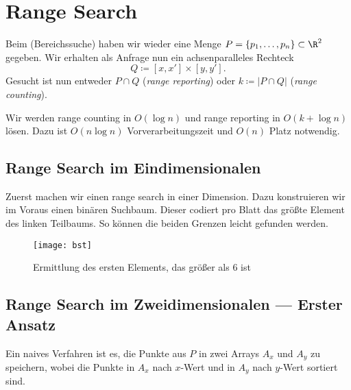\section{Range Search}

Beim  (Bereichssuche) haben wir wieder eine Menge \( P = \left \{ p_1, \dots, p_n \right \} \subset \R^2 \) gegeben. Wir erhalten als Anfrage nun ein achsenparalleles Rechteck
\begin{equation*}
  Q \coloneqq [x,x'] \times [y,y']\text{.}
\end{equation*}
Gesucht ist nun entweder \( P \cap Q \) (\emph{range reporting}) oder \( k \coloneqq \left\vert P \cap Q \right\vert \) (\emph{range counting}).

Wir werden range counting in \( O(\log n) \) und range reporting in \( O(k+\log n) \) lösen. Dazu ist \( O(n\log n) \) Vorverarbeitungszeit und \( O(n) \) Platz notwendig.

\subsection{Range Search im Eindimensionalen}

\begin{minipage}{.55\textwidth}
  Zuerst machen wir einen range search in einer Dimension. Dazu konstruieren wir im Voraus einen binären Suchbaum. Dieser codiert pro Blatt das größte Element des linken Teilbaums. So können die beiden Grenzen leicht gefunden werden.
  \vspace*{1em}
\end{minipage}
\hfill
\begin{minipage}{.3\textwidth}
  \begin{figure}[H]
    \texttt{[image: bst]}
    \caption{Ermittlung des ersten Elements, das größer als \( 6 \) ist}
  \end{figure}
  \vspace*{1em}
\end{minipage}

\subsection{Range Search im Zweidimensionalen --- Erster Ansatz}

Ein naives Verfahren ist es, die Punkte aus \( P \) in zwei Arrays \( A_x \) und \( A_y \) zu speichern, wobei die Punkte in \( A_x \) nach \( x \)-Wert und in \( A_y \) nach \( y \)-Wert sortiert sind.

